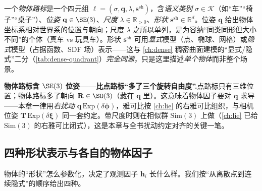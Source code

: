 \begin{definition}[物体路标]\label{def:semantic-object}
一个\emph{物体路标}是一个四元组 $\boldsymbol\ell=(\sigma,\mathbf{q},\lambda,\mathbf{s}^{\mathrm{sh}})$，含\emph{语义类别} $\sigma\in\mathcal{K}$（如“车”“椅子”“桌子”）、\emph{位姿} $\mathbf{q}\in\SE(3)$、\emph{尺度} $\lambda\in\mathbb{R}_{>0}$、\emph{形状} $\mathbf{s}^{\mathrm{sh}}\in\mathbb{R}^d$\cite{carlone2026handbook}。位姿 $\mathbf{q}$ 给出物体坐标系相对世界系的位置与朝向；尺度 $\lambda$ 之所以单列，是为容纳“同类同形但大小不同”的个体（真车 vs 玩具车）。形状 $\mathbf{s}^{\mathrm{sh}}$ 可用\emph{显式}模型（点、椭球、网格）或\emph{隐式}模型（占据函数、SDF 场）表示——这与 \cref{ch:dense} 稠密曲面建模的“显式/隐式”二分（\cref{tab:dense-quadrant}）\emph{完全同源}，只是这里描述\emph{单个物体}而非整个场景。
\end{definition}

\begin{note}
\textbf{物体路标含 $\SE(3)$ 位姿——比点路标“多了三个旋转自由度”.}\;点路标只有三维位置；物体路标多了朝向 $\mathbf{R}\in\SO(3)$（藏在 $\mathbf{q}$ 里）。这意味着物体因子要对 $\mathbf{q}$ 求导——本章一律用\emph{右扰动} $\mathbf{q}\,\mathrm{Exp}(\delta\boldsymbol\phi)$，雅可比按 \cref{ch:lie} 的右雅可比组织，与相机位姿 $\mathbf{T}\,\mathrm{Exp}(\delta\boldsymbol\xi)$ 同一套约定。带尺度时则在相似群 $\mathrm{Sim}(3)$ 上做（\cref{ch:lie} 已给 $\mathrm{Sim}(3)$ 的右雅可比闭式），这是本章与全书扰动约定对齐的关键一笔。
\end{note}

\subsection{四种形状表示与各自的物体因子}
\label{sec:semantic-object-shape}

物体的“形状”怎么参数化，决定了观测因子 $\mathbf{h}_i$ 长什么样。我们按“从离散点到连续隐式”的顺序给出四种\cite{carlone2026handbook}。

